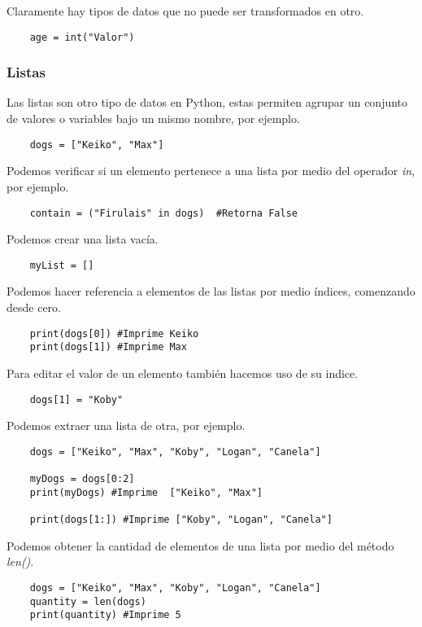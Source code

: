 \documentclass[12pt]{article}
\begin{document}
    Claramente hay tipos de datos que no puede ser transformados en otro.
    \begin{lstlisting}
    age = int("Valor")
    \end{lstlisting}

    \subsubsection{Listas}
    Las listas son otro tipo de datos en Python, estas permiten agrupar un conjunto de valores o variables bajo un mismo
    nombre, por ejemplo.

    \begin{lstlisting}
    dogs = ["Keiko", "Max"]
    \end{lstlisting}

    Podemos verificar si un elemento pertenece a una lista por medio del operador \textit{in}, por ejemplo.
    \begin{lstlisting}
    contain = ("Firulais" in dogs)  #Retorna False
    \end{lstlisting}

    Podemos crear una lista vacía.
    \begin{lstlisting}
    myList = []
    \end{lstlisting}

    Podemos hacer referencia a elementos de las listas por medio índices, comenzando desde cero.
    \begin{lstlisting}
    print(dogs[0]) #Imprime Keiko
    print(dogs[1]) #Imprime Max
    \end{lstlisting}

    Para editar el valor de un elemento también hacemos uso de su indice.
    \begin{lstlisting}
    dogs[1] = "Koby"
    \end{lstlisting}

    Podemos extraer una lista de otra, por ejemplo.
    \begin{lstlisting}
    dogs = ["Keiko", "Max", "Koby", "Logan", "Canela"]

    myDogs = dogs[0:2]
    print(myDogs) #Imprime  ["Keiko", "Max"]

    print(dogs[1:]) #Imprime ["Koby", "Logan", "Canela"]
    \end{lstlisting}

    Podemos obtener la cantidad de elementos de una lista por medio del método \textit{len()}.
    \begin{lstlisting}
    dogs = ["Keiko", "Max", "Koby", "Logan", "Canela"]
    quantity = len(dogs)
    print(quantity) #Imprime 5
    \end{lstlisting}
\end{document}
